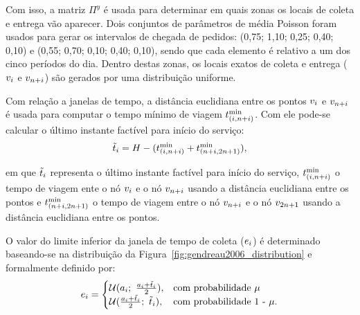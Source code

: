 Com isso, a matriz $\Pi^y$ é usada para determinar em quais zonas os locais de 
coleta e entrega vão aparecer. 
Dois conjuntos de parâmetros de média Poisson foram usados para gerar os 
intervalos de chegada de pedidos: (0,75; 1,10; 0,25; 0,40; 0,10) e 
(0,55; 0,70; 0,10; 0,40; 0,10), sendo que cada elemento é relativo a
um dos cinco períodos do dia. 
Dentro destas zonas, os locais exatos de coleta e entrega 
($v_{i}$ e $v_{n + i}$) são gerados por uma distribuição uniforme.


Com relação a janelas de tempo, a distância euclidiana entre os pontos 
$v_{i}$ e $v_{n + i}$ é usada para computar o tempo mínimo de 
viagem $t_{(i,n + i)}^{\min}$.
Com ele pode-se calcular o último instante factível para início do serviço:
%
\begin{equation}
  \Tilde{t}_{i} = H 
    - (t_{(i,n + i)}^{\min} 
    + t_{(n + i,2n + 1)}^{\min}),
    \label{eq:gendreau2006_leat_feasible_time}
\end{equation}

\noindent em que $\Tilde{t}_i$ representa o último instante factível 
para início do serviço,
$t_{(i,n + i)}^{\min}$ o tempo de
viagem ente o nó $v_{i}$ e o nó $v_{n + i}$ usando a distância 
euclidiana entre os pontos e
$t_{(n + i,2n + 1)}^{\min}$ o tempo de viagem entre 
o nó $v_{n + i}$ e o nó $v_{2n + 1}$ usando a distância euclidiana entre 
os pontos.


O valor do limite inferior da janela de tempo de coleta
($e_i$) é determinado baseando-se na 
distribuição da Figura~\ref{fig:gendreau2006_distribution} e formalmente 
definido por:
%
\begin{equation}
  e_i = 
    \begin{cases}
      \mathcal{U}(a_i;\ \frac{a_i + \Tilde{t}_i}{2}), 
        & \text{com probabilidade $\mu$} \\
      \mathcal{U}(\frac
        {a_i + \Tilde{t}_i}{2};\ \Tilde{t}_i), 
        & \text{com probabilidade 1 - $\mu$}.
      \end{cases}
\label{eq:gendreau2006_earliestTimewindow}
\end{equation}

